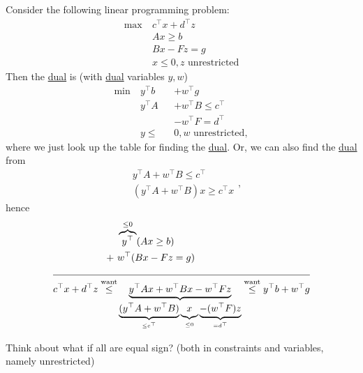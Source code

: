 \begin{eg}
	Consider the following linear programming problem:
	\[
		\begin{aligned}
			\max~ & c^{\top}x+d^{\top}z            \\
			      & Ax\geq b                       \\
			      & Bx - Fz = g                    \\
			      & x\leq 0, z\text{ unrestricted}
		\end{aligned}
	\]
	Then the \hyperref[def:dual]{dual} is (with \hyperref[def:dual]{dual} variables \(y, w\))
	\[
		\begin{alignedat}{3}
			\min~ & y^{\top}b &  & +w^{\top}g                 \\
			      & y^{\top}A &  & +w^{\top}B  \leq c^{\top}  \\
			      &           &  & -w^{\top}F = d^{\top}      \\
			      & y\leq     &  & 0, w \text{ unrestricted},
		\end{alignedat}
	\]
	where we just look up the table for finding the \hyperref[def:dual]{dual}. Or, we can also find the \hyperref[def:dual]{dual} from
	\[
		\begin{split}
			 & y^{\top} A + w^{\top} B\leq c^{\top}    \\
			 & (y^{\top} A+w^{\top} B)x\geq c^{\top} x
		\end{split},
	\]
	hence
	\[
		\begin{split}
			                                                 & \overbrace{y^{\top}}^{\leq 0}(Ax\geq b)                                                                                                                                                                                                         \\
			+\                                               & w^{\top}(Bx - Fz = g)                                                                                                                                                                                                                           \\
			\cline{1-2}
			c^{\top}x + d^{\top}z\overset{\text{want}}{\leq} & \underbrace{y^{\top}Ax + w^{\top}Bx - w^{\top} Fz}_{\underbrace{(y^{\top} A + w^{\top} B)}_{\leq c^{\top}}\underbrace{\vphantom{y^{\top}A}x}_{\leq 0} \underbrace{- (w^{\top} F)z}_{=d^{\top}}} \overset{\text{want}}{\leq} y^{\top}b+w^{\top}g
		\end{split}
	\]
\end{eg}
\begin{remark}
	Think about what if all are equal sign? (both in constraints and variables, namely unrestricted)
\end{remark}

